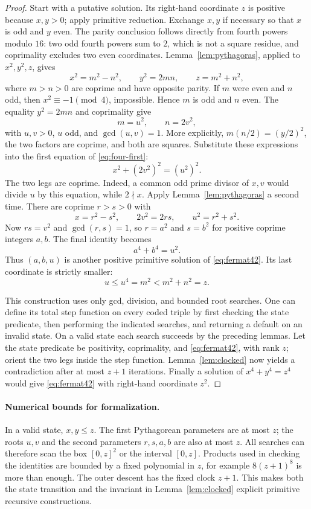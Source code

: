 \begin{proof}
Start with a putative solution. Its right-hand coordinate $z$ is positive
because $x,y>0$; apply primitive reduction. Exchange
$x,y$ if necessary so that $x$ is odd and $y$ even. The parity conclusion
follows directly from fourth powers modulo $16$: two odd fourth powers
sum to $2$, which is not a square residue, and coprimality excludes two
even coordinates. Lemma~\ref{lem:pythagoras}, applied to $x^2,y^2,z$,
gives
\begin{equation}\label{eq:four-first}
 x^2=m^2-n^2,\qquad y^2=2mn,\qquad z=m^2+n^2,
\end{equation}
where $m>n>0$ are coprime and have opposite parity.
If $m$ were even and $n$ odd, then $x^2\equiv-1\pmod4$, impossible.
Hence $m$ is odd and $n$ even. The equality $y^2=2mn$ and coprimality
give
\[
 m=u^2,\qquad n=2v^2,
\]
with $u,v>0$, $u$ odd, and $\gcd(u,v)=1$. More explicitly,
$m(n/2)=(y/2)^2$, the two factors are coprime, and both are squares.
Substitute these expressions into the first equation of
\eqref{eq:four-first}:
\[
 x^2+(2v^2)^2=(u^2)^2.
\]
The two legs are coprime. Indeed, a common odd prime divisor of $x,v$
would divide $u$ by this equation, while $2\nmid x$.
Apply Lemma~\ref{lem:pythagoras} a second time. There are coprime
$r>s>0$ with
\[
 x=r^2-s^2,\qquad 2v^2=2rs,\qquad u^2=r^2+s^2.
\]
Now $rs=v^2$ and $\gcd(r,s)=1$, so $r=a^2$ and $s=b^2$ for
positive coprime integers $a,b$. The final identity becomes
\[
 a^4+b^4=u^2.
\]
Thus $(a,b,u)$ is another positive primitive solution of
\eqref{eq:fermat42}. Its last coordinate is strictly smaller:
\[
 u\leq u^4=m^2<m^2+n^2=z.
\]

This construction uses only gcd, division, and bounded root searches.
One can define its total step function on every coded triple by first
checking the state predicate, then performing the indicated searches, and
returning a default on an invalid state. On a valid state each search
succeeds by the preceding lemmas. Let the state predicate be positivity,
coprimality, and \eqref{eq:fermat42}, with rank $z$; orient the two legs
inside the step function. Lemma~\ref{lem:clocked} now yields a
contradiction after at most $z+1$ iterations. Finally a solution of
$x^4+y^4=z^4$ would give \eqref{eq:fermat42} with right-hand coordinate
$z^2$.
\end{proof}

\paragraph{Numerical bounds for formalization.}
In a valid state, $x,y\leq z$. The first Pythagorean parameters are at
most $z$; the roots $u,v$ and the second parameters $r,s,a,b$ are also at
most $z$. All searches can therefore scan the box $[0,z]^2$ or the
interval $[0,z]$. Products used in checking the identities are bounded by
a fixed polynomial in $z$, for example $8(z+1)^8$ is more than enough.
The outer descent has the fixed clock $z+1$. This makes both the state
transition and the invariant in Lemma~\ref{lem:clocked} explicit
primitive recursive constructions.

